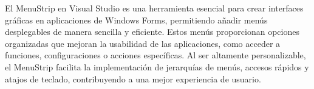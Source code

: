 El MenuStrip en Visual Studio es una herramienta esencial para crear interfaces gráficas en aplicaciones de Windows Forms, permitiendo añadir menús desplegables de manera sencilla y eficiente. Estos menús proporcionan opciones organizadas que mejoran la usabilidad de las aplicaciones, como acceder a funciones, configuraciones o acciones específicas. Al ser altamente personalizable, el MenuStrip facilita la implementación de jerarquías de menús, accesos rápidos y atajos de teclado, contribuyendo a una mejor experiencia de usuario.